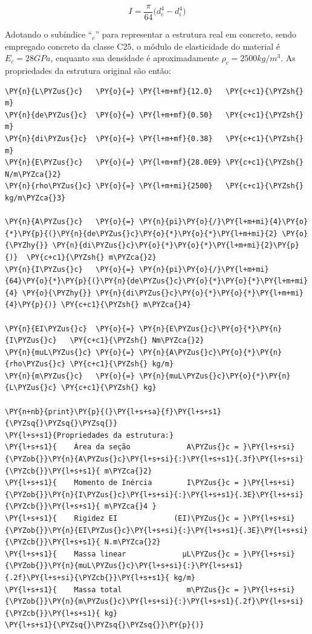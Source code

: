 \begin{equation}
I = \frac{\pi}{64}\big(d_e^4 - d_i^4 \big)
\label{eq:Ic}
\end{equation}

    Adotando o subíndice ``\(_c\)'' para representar a estrutura real em
concreto, sendo empregado concreto da classe C25, o módulo de
elasticidade do material é \(E_c=28 GPa\), enquanto sua densidade é
aproximadamente \(\rho_c=2500 kg/m^3\). As propriedades da estrutura
original são então:

    \begin{tcolorbox}[breakable, size=fbox, boxrule=1pt, pad at break*=1mm,colback=cellbackground, colframe=cellborder]
\begin{Verbatim}[commandchars=\\\{\}]
\PY{n}{L\PYZus{}c}   \PY{o}{=} \PY{l+m+mf}{12.0}   \PY{c+c1}{\PYZsh{} m}
\PY{n}{de\PYZus{}c}  \PY{o}{=} \PY{l+m+mf}{0.50}   \PY{c+c1}{\PYZsh{} m}
\PY{n}{di\PYZus{}c}  \PY{o}{=} \PY{l+m+mf}{0.38}   \PY{c+c1}{\PYZsh{} m}
\PY{n}{E\PYZus{}c}   \PY{o}{=} \PY{l+m+mf}{28.0E9} \PY{c+c1}{\PYZsh{} N/m\PYZca{}2}
\PY{n}{rho\PYZus{}c} \PY{o}{=} \PY{l+m+mi}{2500}   \PY{c+c1}{\PYZsh{} kg/m\PYZca{}3}

\PY{n}{A\PYZus{}c}   \PY{o}{=} \PY{n}{pi}\PY{o}{/}\PY{l+m+mi}{4}\PY{o}{*}\PY{p}{(}\PY{n}{de\PYZus{}c}\PY{o}{*}\PY{o}{*}\PY{l+m+mi}{2} \PY{o}{\PYZhy{}} \PY{n}{di\PYZus{}c}\PY{o}{*}\PY{o}{*}\PY{l+m+mi}{2}\PY{p}{)}  \PY{c+c1}{\PYZsh{} m\PYZca{}2}
\PY{n}{I\PYZus{}c}   \PY{o}{=} \PY{n}{pi}\PY{o}{/}\PY{l+m+mi}{64}\PY{o}{*}\PY{p}{(}\PY{n}{de\PYZus{}c}\PY{o}{*}\PY{o}{*}\PY{l+m+mi}{4} \PY{o}{\PYZhy{}} \PY{n}{di\PYZus{}c}\PY{o}{*}\PY{o}{*}\PY{l+m+mi}{4}\PY{p}{)} \PY{c+c1}{\PYZsh{} m\PYZca{}4}

\PY{n}{EI\PYZus{}c}  \PY{o}{=} \PY{n}{E\PYZus{}c}\PY{o}{*}\PY{n}{I\PYZus{}c}   \PY{c+c1}{\PYZsh{} Nm\PYZca{}2}
\PY{n}{muL\PYZus{}c} \PY{o}{=} \PY{n}{A\PYZus{}c}\PY{o}{*}\PY{n}{rho\PYZus{}c} \PY{c+c1}{\PYZsh{} kg/m}
\PY{n}{m\PYZus{}c}   \PY{o}{=} \PY{n}{muL\PYZus{}c}\PY{o}{*}\PY{n}{L\PYZus{}c} \PY{c+c1}{\PYZsh{} kg}

\PY{n+nb}{print}\PY{p}{(}\PY{l+s+sa}{f}\PY{l+s+s1}{\PYZsq{}\PYZsq{}\PYZsq{}}
\PY{l+s+s1}{Propriedades da estrutura:}
\PY{l+s+s1}{    Área da seção             A\PYZus{}c = }\PY{l+s+si}{\PYZob{}}\PY{n}{A\PYZus{}c}\PY{l+s+si}{:}\PY{l+s+s1}{.3f}\PY{l+s+si}{\PYZcb{}}\PY{l+s+s1}{ m\PYZca{}2}
\PY{l+s+s1}{    Momento de Inércia        I\PYZus{}c = }\PY{l+s+si}{\PYZob{}}\PY{n}{I\PYZus{}c}\PY{l+s+si}{:}\PY{l+s+s1}{.3E}\PY{l+s+si}{\PYZcb{}}\PY{l+s+s1}{ m\PYZca{}4 }
\PY{l+s+s1}{    Rigidez EI             (EI)\PYZus{}c = }\PY{l+s+si}{\PYZob{}}\PY{n}{EI\PYZus{}c}\PY{l+s+si}{:}\PY{l+s+s1}{.3E}\PY{l+s+si}{\PYZcb{}}\PY{l+s+s1}{ N.m\PYZca{}2}
\PY{l+s+s1}{    Massa linear             μL\PYZus{}c = }\PY{l+s+si}{\PYZob{}}\PY{n}{muL\PYZus{}c}\PY{l+s+si}{:}\PY{l+s+s1}{.2f}\PY{l+s+si}{\PYZcb{}}\PY{l+s+s1}{ kg/m}
\PY{l+s+s1}{    Massa total               m\PYZus{}c = }\PY{l+s+si}{\PYZob{}}\PY{n}{m\PYZus{}c}\PY{l+s+si}{:}\PY{l+s+s1}{.2f}\PY{l+s+si}{\PYZcb{}}\PY{l+s+s1}{ kg}
\PY{l+s+s1}{\PYZsq{}\PYZsq{}\PYZsq{}}\PY{p}{)}
\end{Verbatim}
\end{tcolorbox}

